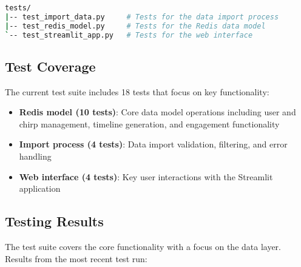 \documentclass[a4paper,11pt]{article}
\begin{document}
\begin{lstlisting}[language=bash, caption=Test suite organization]
tests/
|-- test_import_data.py     # Tests for the data import process
|-- test_redis_model.py     # Tests for the Redis data model
`-- test_streamlit_app.py   # Tests for the web interface
\end{lstlisting}

\subsection{Test Coverage}
The current test suite includes 18 tests that focus on key functionality:

\begin{itemize}
    \item \textbf{Redis model (10 tests)}: Core data model operations including user and chirp management, timeline generation, and engagement functionality
    \item \textbf{Import process (4 tests)}: Data import validation, filtering, and error handling
    \item \textbf{Web interface (4 tests)}: Key user interactions with the Streamlit application
\end{itemize}

\subsection{Testing Results}
The test suite covers the core functionality with a focus on the data layer. Results from the most recent test run:
\end{document}
